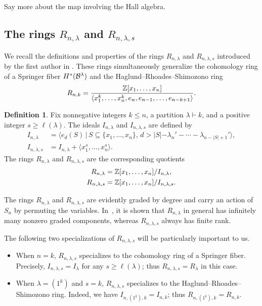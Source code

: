 \documentclass[11pt]{amsart}
\theoremstyle{definition}
\newtheorem{definition}[theorem]{Definition}
\newcommand{\st}{\,|\,}
\newcommand{\la}{\lambda}
\begin{document}
Say more about the map involving the Hall algebra.


\subsection{The rings \texorpdfstring{$R_{n,\lambda}$}{Rn,lambda} and \texorpdfstring{$R_{n,\lambda,s}$}{Rn,lambda,s}}

We recall the definitions and properties of the rings $R_{n,\la}$ and $R_{n,\la,s}$ introduced by the first author in \cite{GriffinOSP}. These rings simultaneously generalize the cohomology ring of a Springer fiber $H^*(\mathcal{B}^\lambda)$ and the Haglund--Rhoades--Shimozono ring
\begin{align}
    R_{n,k} = \frac{\mathbb{Z}[x_1,\dots, x_n]}{\langle x_1^k,\dots, x_n^k,e_n,e_{n-1},\dots, e_{n-k+1}\rangle}.
\end{align}

\begin{definition}\label{def:RnLaDef}
Fix nonnegative integers $k\leq n$, a partition $\la\vdash k$, and a positive integer $s\geq \ell(\la)$. 
 The ideals $I_{n,\la}$ and $I_{n,\la,s}$ are defined by
 \begin{align}
     I_{n,\la} &= \langle e_d(S) \st S\subseteq \{x_1,\dots, x_n\}, \, d > |S| - \la_n' - \cdots - \la_{n-|S|+1}'\rangle,\\
     I_{n,\la,s} &= I_{n,\la} +  \langle x_1^s,\dots, x_n^s\rangle.
 \end{align}
 The rings $R_{n,\la}$ and $R_{n,\la,s}$ are the corresponding quotients
 \begin{align}
 R_{n,\la} &= \bZ[x_1,\dots, x_n]/I_{n,\la},\\
 R_{n,\la,s} &= \bZ[x_1,\dots, x_n]/I_{n,\la,s}.
 \end{align}
 \end{definition}
 The rings $R_{n,\la}$ and $R_{n,\la,s}$ are evidently graded by degree and carry an action of $S_n$ by permuting the variables. In~\cite{GriffinOSP}, it is shown that $R_{n,\la}$ in general has infinitely many nonzero graded components, whereas $R_{n,\la,s}$ always has finite rank.

The following two specializations of $R_{n,\la,s}$ will be particularly important to us.
\begin{itemize}
    \item When $n=k$, $R_{n,\la,s}$ specializes to the cohomology ring of a Springer fiber. Precisely, $I_{n,\la,s} = I_{\lambda}$ for any $s\geq \ell(\la)$; thus $R_{n,\la,s} = R_\la$ in this case.
    \item When $\la = (1^k)$ and $s=k$, $R_{n,\la,s}$ specializes to the Haglund--Rhoades--Shimozono ring. Indeed, we have $I_{n,(1^k),k} = I_{n,k}$; thus $R_{n,(1^k),k} = R_{n,k}$.
\end{itemize}
\end{document}
